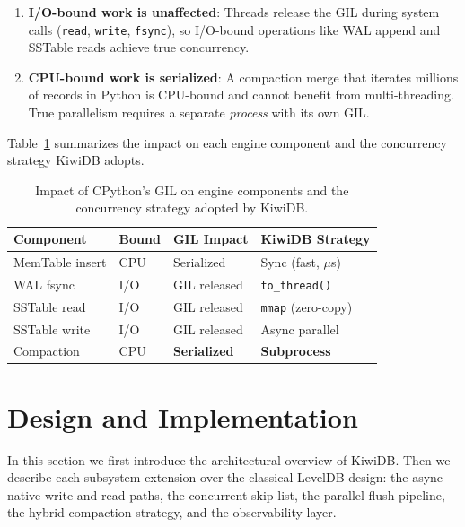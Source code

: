 \documentclass[conference]{IEEEtran}
\begin{document}
\begin{enumerate}[leftmargin=*]
    \item \textbf{I/O-bound work is unaffected}: Threads release the GIL during system calls (\texttt{read}, \texttt{write}, \texttt{fsync}), so I/O-bound operations like WAL append and SSTable reads achieve true concurrency.
    \item \textbf{CPU-bound work is serialized}: A compaction merge that iterates millions of records in Python is CPU-bound and cannot benefit from multi-threading. True parallelism requires a separate \emph{process} with its own GIL.
\end{enumerate}

Table~\ref{tab:gil-impact} summarizes the impact on each engine component and the concurrency strategy KiwiDB adopts.

\begin{table}[t]
\centering
\caption{Impact of CPython's GIL on engine components and the concurrency strategy adopted by KiwiDB.}
\label{tab:gil-impact}
\begin{tabular}{@{}llll@{}}
\toprule
\textbf{Component} & \textbf{Bound} & \textbf{GIL Impact} & \textbf{KiwiDB Strategy} \\
\midrule
MemTable insert & CPU & Serialized & Sync (fast, $\mu$s) \\
WAL fsync & I/O & GIL released & \texttt{to\_thread()} \\
SSTable read & I/O & GIL released & \texttt{mmap} (zero-copy) \\
SSTable write & I/O & GIL released & Async parallel \\
Compaction & CPU & \textbf{Serialized} & \textbf{Subprocess} \\
\bottomrule
\end{tabular}
\end{table}

\section{Design and Implementation}
\label{sec:design}

In this section we first introduce the architectural overview of KiwiDB. Then we describe each subsystem extension over the classical LevelDB design: the async-native write and read paths, the concurrent skip list, the parallel flush pipeline, the hybrid compaction strategy, and the observability layer.
\end{document}
